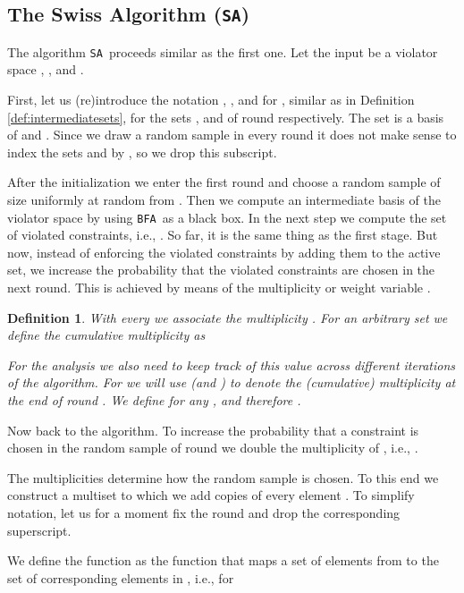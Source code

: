\documentclass[12pt]{article}
\newtheorem{definition2}[theorem2]{Definition}
\newenvironment{definition}{\begin{definition2}}{\end{definition2}}
\theoremstyle{remark}
\def\stageII{\texttt{SA}}
\def\stageIII{\texttt{BFA}}
\begin{document}
\subsection{The Swiss Algorithm (\stageII)}
\label{subsec:secondstage}

The algorithm \stageII~proceeds similar as the first one.
Let the input be a violator space , , and .

First, let us 
(re)introduce the notation , , and  for , similar as in 
Definition \ref{def:intermediatesets}, for the sets ,  and  of round 
respectively. The set  is a basis of  and .
Since we draw a random sample in every round it does not make sense to index the sets
 and  by , so we drop this subscript.

After the initialization we enter the first round and choose a random sample  of size
 uniformly at random from . Then we compute an intermediate basis 
of the violator space   by using \stageIII~as
a black box. 
In the next step we compute the set of violated constraints, i.e., .
So far, it is the same thing as the first stage. But now, instead of enforcing the violated
constraints by adding them to the active set, we increase the probability that the violated
constraints are chosen in the next round. This is achieved by means of the multiplicity
or weight variable .

    \begin{definition}
\label{def:intermediatemultiplicities}
With every  we associate the \emph{multiplicity} . For an arbitrary
set  we define the \emph{cumulative multiplicity} as

For the analysis we also need to keep track of this value across different iterations
of the algorithm. For  we will use  (and
) to denote the (cumulative) multiplicity at the end of round .
We define  for any ,
and therefore .
\end{definition}

Now back to the algorithm. To increase the probability that a constraint  is chosen in the
random sample of round  we double the multiplicity of ,
i.e., .

The multiplicities determine
how the random sample  is chosen.
To this end we construct a multiset
 to which we add  copies of every element .
To simplify notation, let us for a moment fix the round  and drop the
corresponding superscript.

We define the function  as
the function that maps a set of elements from  to the set of corresponding elements in , 
i.e., for
 
\end{document}
